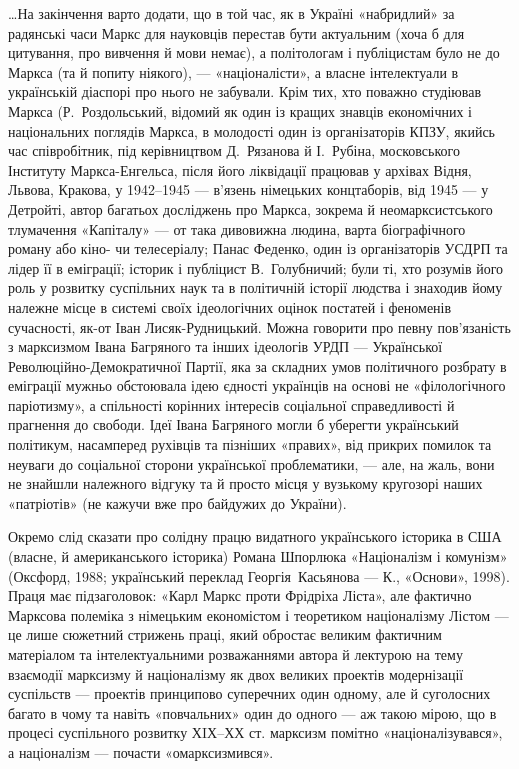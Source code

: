 \ldots{}На закінчення варто додати, що в той час, як в Україні «набридлий» 
за радянські часи Маркс для науковців перестав бути актуальним (хоча б 
для цитування, про вивчення й мови немає), а політологам і публіцистам 
було не до Маркса (та й попиту ніякого), — «націоналісти», а власне 
інтелектуали в українській діаспорі про нього не забували. Крім тих, 
хто поважно студіював Маркса (Р.~Роздольський, відомий як один із 
кращих знавців економічних і національних поглядів Маркса, в 
молодості один із організаторів КПЗУ, якийсь час співробітник, під 
керівництвом Д.~Рязанова й І.~Рубіна, московського Інституту 
Маркса-Енгельса, після його ліквідації працював у архівах Відня, 
Львова, Кракова, у 1942--1945 — в'язень німецьких концтаборів, від 1945 — у 
Детройті, автор багатьох досліджень про Маркса, зокрема й 
неомарксистського тлумачення «Капіталу» — от така дивовижна людина, 
варта біографічного роману або кіно- чи телесеріалу; Панас Феденко, 
один із організаторів УСДРП та лідер її в еміграції; історик і 
публіцист В.~Голубничий; були ті, хто розумів його роль у розвитку 
суспільних наук та в політичній історії людства і знаходив йому 
належне місце в системі своїх ідеологічних оцінок постатей і 
феноменів сучасності, як-от Іван Лисяк-Рудницький. Можна говорити про 
певну пов'язаність з марксизмом Івана Багряного та інших ідеологів 
УРДП — Української Революційно-Демократичної Партії, яка за складних 
умов політичного розбрату в еміграції мужньо обстоювала ідею єдності 
українців на основі не «філологічного паріотизму», а спільності 
корінних інтересів соціальної справедливості й прагнення до свободи. 
Ідеї Івана Багряного могли б уберегти український політикум, 
насамперед рухівців та пізніших «правих», від прикрих помилок та 
неуваги до соціальної сторони української проблематики, — але, на 
жаль, вони не знайшли належного відгуку та й просто місця у вузькому 
кругозорі наших «патріотів» (не кажучи вже про байдужих до України). 


Окремо слід сказати про солідну працю видатного українського 
історика в США (власне, й американського історика) Романа Шпорлюка 
«Націоналізм і комунізм» (Оксфорд, 1988; український переклад Георгія~Касьянова — К., «Основи», 1998). Праця має підзаголовок: «Карл Маркс проти 
Фрідріха Ліста», але фактично Марксова полеміка з німецьким 
економістом і теоретиком націоналізму Лістом — це лише сюжетний 
стрижень праці, який обростає великим фактичним матеріалом та 
інтелектуальними розважаннями автора й лектурою на тему взаємодії 
марксизму й націоналізму як двох великих проектів модернізації 
суспільств — проектів принципово суперечних один одному, але й 
суголосних багато в чому та навіть «повчальних» один до одного — аж 
такою мірою, що в процесі суспільного розвитку ХIХ--ХХ ст. марксизм 
помітно «націоналізувався», а націоналізм — почасти «омарксизмився».


